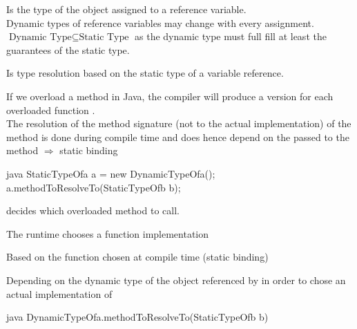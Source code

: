 \begin{defnbox}\nospacing
  \begin{defn}\label{defn:dynamicType}
    Is the type of the object assigned to a reference variable.\\
    Dynamic types of reference variables may change with every assignment.\\
    $\text{Dynamic Type}\subseteq\text{Static Type}$ as the dynamic type must
    full fill at least the guarantees of the static type.
  \end{defn}
\end{defnbox}
\begin{defnbox}\nospacing
  \begin{defn}
    Is type resolution based on the static type of a variable reference.
  \end{defn}
\end{defnbox}
\begin{defnbox}\nospacing
  \begin{defn}
    If we overload a method in Java, the compiler will produce a version for
    each overloaded function .\\
    The resolution of the method signature (not to the actual implementation) of the
    method is done during compile time and does hence depend on the 
    passed to the method $\Rightarrow$ static binding
    \begin{mintlinebox}{java}
      StaticTypeOfa a = new DynamicTypeOfa();
      a.methodToResolveTo(StaticTypeOfb b);
    \end{mintlinebox}
     decides which overloaded method to call.
  \end{defn}
\end{defnbox}
\begin{defnbox}\nospacing
  \begin{defn}
    The runtime chooses a function implementation
    \begin{numberlistnosep}
        \item Based on the function  chosen at compile time
      (static binding)
        \item Depending on the dynamic type of the object referenced by
       in order to chose an actual implementation of
      \begin{mintlinebox}{java}
          DynamicTypeOfa.methodToResolveTo(StaticTypeOfb b)
      \end{mintlinebox}
    \end{numberlistnosep}
  \end{defn}
\end{defnbox}
